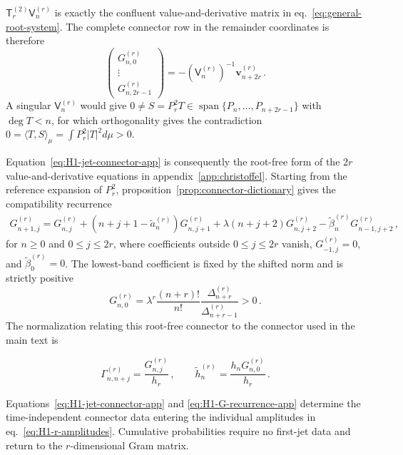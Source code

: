 \documentclass[a4paper,11pt]{article}
\def\dd{d}%
\theoremstyle{definition}
\theoremstyle{remark}
\newcommand{\dd}{\mathrm d}
\newcommand{\Span}{\operatorname{span}}
\begin{document}
$\mathsf T_r^{(2)}\mathsf V_n^{(r)}$ is exactly the confluent value-and-derivative matrix in eq.~\eqref{eq:general-root-system}. The complete connector row in the remainder coordinates is therefore
\begin{equation}
   \begin{pmatrix}
      G_{n,0}^{(r)}\\ \vdots\\ G_{n,2r-1}^{(r)}
   \end{pmatrix}
   =-(\mathsf V_n^{(r)})^{-1}\mathbf v_{n+2r}^{(r)}\,.
   \label{eq:H1-jet-connector-app}
\end{equation}
A singular $\mathsf V_n^{(r)}$ would give
$0\ne S=P_r^2T\in\Span\{P_n,\ldots,P_{n+2r-1}\}$ with $\deg T<n$, for which
orthogonality gives the contradiction
$0=\langle T,S\rangle_\mu=\int P_r^2|T|^2\dd\mu>0$.

Equation~\eqref{eq:H1-jet-connector-app} is consequently the root-free form of the $2r$ value-and-derivative equations in appendix~\ref{app:christoffel}. Starting from the reference expansion of $P_r^2$, proposition~\ref{prop:connector-dictionary} gives the compatibility recurrence \begin{equation}
\begin{aligned}
   G_{n+1,j}^{(r)}=
   G_{n,j}^{(r)}
   +(n+j+1-\widetilde a_n^{(r)})G_{n,j+1}^{(r)}
   +\lambda(n+j+2)G_{n,j+2}^{(r)}
   -\widetilde\beta_n^{(r)}G_{n-1,j+2}^{(r)}\,,
\end{aligned}
   \label{eq:H1-G-recurrence-app}
\end{equation}
for $n\ge0$ and $0\le j\le2r$, where coefficients outside $0\le j\le2r$ vanish, $G_{-1,j}^{(r)}=0$, and $\widetilde\beta_0^{(r)}=0$. The lowest-band coefficient is fixed by the shifted norm and is strictly positive
\begin{equation}
   G_{n,0}^{(r)}
   =\lambda^r\frac{(n+r)!}{n!}
   \frac{\Delta_{n+r}^{(r)}}{\Delta_{n+r-1}^{(r)}}>0\,.
   \label{eq:H1-G0-Delta-app}
\end{equation}
The normalization relating this root-free connector to the
connector used in the main text is

\begin{equation}
   \Gamma_{n,n+j}^{(r)}
   =\frac{G_{n,j}^{(r)}}{h_r}\,,
   \qquad
   \widetilde h_n^{(r)}
   =\frac{h_nG_{n,0}^{(r)}}{h_r}\,.
   \label{eq:H1-Gamma-G-bridge-app}
\end{equation}

Equations~\eqref{eq:H1-jet-connector-app} and
\eqref{eq:H1-G-recurrence-app} determine the time-independent
connector data entering the individual amplitudes in
eq.~\eqref{eq:H1-r-amplitudes}. Cumulative probabilities require no
first-jet data and return to the $r$-dimensional Gram matrix.
\end{document}
